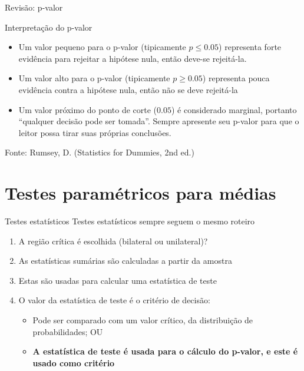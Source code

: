 \documentclass{beamer}
\begin{document}
\begin{frame}{Revisão: p-valor}
\begin{block}{Interpretação do p-valor}
  \begin{itemize}
    \small
  \item Um valor pequeno para o p-valor (tipicamente $p \le 0.05$)
    representa forte evidência para rejeitar a hipótese nula, então
    deve-se rejeitá-la.
  \item Um valor alto para o p-valor (tipicamente $p \ge 0.05$)
    representa pouca evidência contra a hipótese nula, então não se
    deve rejeitá-la
  \item Um valor próximo do ponto de corte ($0.05$) é considerado
    marginal, portanto ``qualquer decisão pode ser tomada''. Sempre
    apresente seu p-valor para que o leitor possa tirar suas próprias
    conclusões.
  \end{itemize}
\end{block}
Fonte: Rumsey, D. (Statistics for Dummies, 2nd ed.)
\end{frame}

\section{Testes paramétricos para médias}

\begin{frame}{Testes estatísticos}
  Testes estatísticos sempre seguem o mesmo roteiro
  \begin{enumerate}
  \small
  \item A região crítica é escolhida (bilateral ou unilateral)?
  \item As estatísticas sumárias são calculadas a partir da amostra
  \item Estas são usadas para calcular uma estatística de teste
  \item O valor da estatística de teste é o critério de decisão:
    \begin{itemize}
    \item Pode ser comparado com um valor crítico, da distribuição de probabilidades; OU
    \item {\bf A estatística de teste é usada para o cálculo do p-valor, e este é usado como critério}
    \end{itemize}
  \end{enumerate}
\end{frame}
\end{document}
